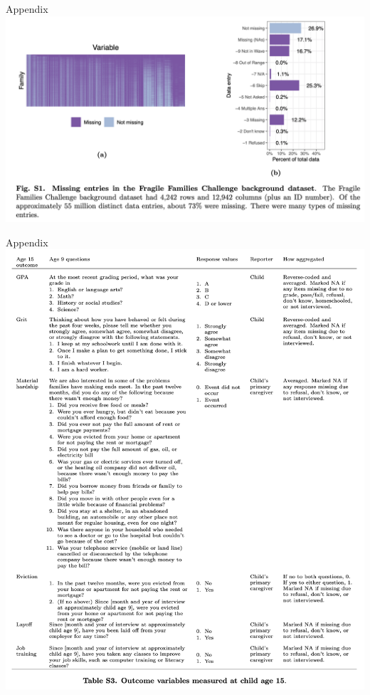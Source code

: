 \documentclass{beamer}
\begin{document}
\begin{frame}{Appendix}
\includegraphics[width = \textwidth]{figures/si_missing_data}
\end{frame}

\begin{frame}{Appendix}
\centering
\includegraphics[height = .8\textheight]{figures/si_outcome_text}
\end{frame}
\end{document}

